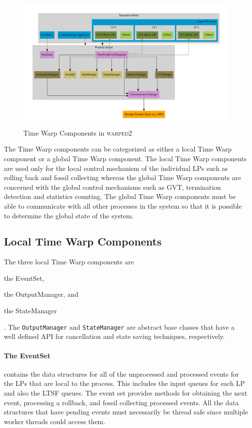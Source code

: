 \documentclass[11pt]{book}
\begin{document}
\begin{figure}
    \centering
    \includegraphics[width=\textwidth,quiet]{figs/graphviz/warped2_overview.pdf}
    \caption{Time Warp Components in \textsc{warped2}}\label{warped2_architecture}
\end{figure}

The Time Warp components can be categorized as either a local Time Warp component or a global
Time Warp component.  The local Time Warp components are used only for the local control
mechanism of the individual LPs such as rolling back and fossil collecting whereas
the global Time Warp components are concerned with the global control mechanisms such as GVT,
termination detection and statistics counting.  The global Time Warp components must be able to
communicate with all other processes in the system so that it is possible to determine the
global state of the system.

\subsection{Local Time Warp Components}

The three local Time Warp components are \begin{inparaenum}[(1)] \item the EventSet,
\item the OutputManager, and \item the StateManager\end{inparaenum}.  The \texttt{OutputManager} and
\texttt{StateManager} are abstract base classes that have a well defined API for cancellation
and state saving techniques, respectively.  

\paragraph{The EventSet} contains the data structures for all of the unprocessed and
processed events for the LPs that are local to the process.  This includes the input queues for
each LP and also the LTSF queues.  The event set provides methods for obtaining the next event,
processing a rollback, and fossil collecting processed events.  All the data structures that have
pending events must necessarily be thread safe since multiple worker threads could access them.
\end{document}
